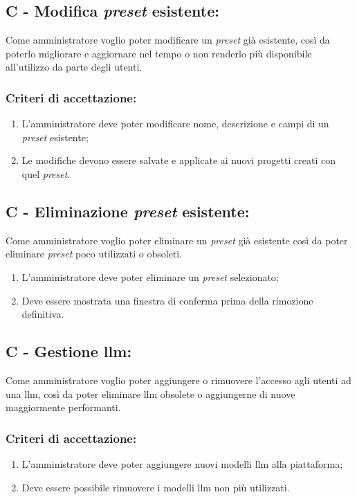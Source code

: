 \vspace{0.5cm}

\subsection*{C - Modifica \textit{preset} esistente:}

\noindent Come amministratore voglio poter modificare un \textit{preset} già esistente, così da poterlo migliorare e aggiornare nel tempo o non renderlo più disponibile all’utilizzo da parte degli utenti.

\subsubsection*{Criteri di accettazione:}

\begin{enumerate}
    \item L'amministratore deve poter modificare nome, descrizione e campi di un \textit{preset} esistente;
    \item Le modifiche devono essere salvate e applicate ai nuovi progetti creati con quel \textit{preset}.
\end{enumerate}

\vspace{0.5cm}

\subsection*{C - Eliminazione \textit{preset} esistente:}

\noindent Come amministratore voglio poter eliminare un \textit{preset} già esistente così da poter eliminare \textit{preset} poco utilizzati o obsoleti.

\begin{enumerate}
    \item L'amministratore deve poter eliminare un \textit{preset} selezionato;
    \item Deve essere mostrata una finestra di conferma prima della rimozione definitiva.
\end{enumerate}

\vspace{0.5cm}

\subsection*{C - Gestione \gls{llm}:}

\noindent Come amministratore voglio poter aggiungere o rimuovere l’accesso agli utenti ad una \gls{llm}, così da poter eliminare \gls{llm} obsolete o aggiungerne di nuove maggiormente performanti.

\subsubsection*{Criteri di accettazione:}

\begin{enumerate}
    \item L'amministratore deve poter aggiungere nuovi modelli \gls{llm} alla piattaforma;
    \item Deve essere possibile rimuovere i modelli \gls{llm} non più utilizzati.
\end{enumerate}